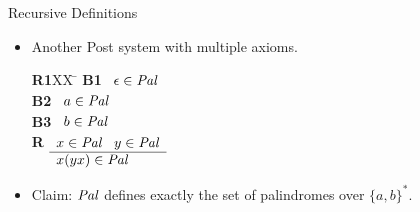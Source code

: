 \begin{wideslide}[bm=,toc=]{Recursive Definitions}
\begin{itemize}
\item  Another Post system with multiple axioms.
\begin{tabbing}
{\bf R1}XX \=  \kill
{\bf B1} \>
        \(\begin{array}[t]{l}
        \epsilon \in \mbox{\it Pal\/}
        \end{array}\) \\[2ex]
{\bf B2} \>
        \(\begin{array}[t]{l}
        a\in \mbox{\it Pal\/}
        \end{array}\) \\[2ex]

 {\bf B3} \>
        \(\begin{array}[t]{l}
        b\in \mbox{\it Pal\/}
        \end{array}\) \\[2ex]
        
{\bf R} \>
        \(\begin{array}[t]{l}
        x \in \mbox{\it Pal\/} \;\;\;y \in \mbox{\it Pal\/} \\
        \hline
        x(yx) \in \mbox{\it Pal\/}
        \end{array}\)
\end{tabbing}
\item Claim:  $\mbox{\it Pal\/}$ defines exactly the set of palindromes over $\{a,b\}^*$.
\end{itemize}
\end{wideslide}

